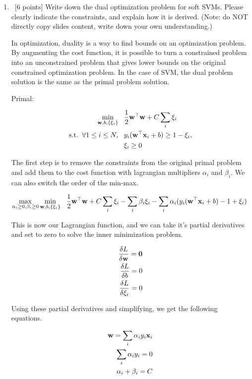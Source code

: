 \documentclass[12pt, fullpage,letterpaper]{article}
\begin{document}
\begin{enumerate}
\begin{enumerate}
	\end{enumerate}
	
	
	\item~[6 points] Write down the dual optimization problem for soft SVMs.  
	Please clearly indicate the constraints, and explain how it is derived. (Note: do NOT directly copy slides content, write down your own understanding.)
	
	In optimization, duality is a way to find bounds on an optimization problem. By augmenting the cost function, it is possible to turn a constrained problem into an unconstrained problem that gives lower bounds on the original constrained optimization problem. In the case of SVM, the dual problem solution is the same as the primal problem solution. 
	
	Primal:
	
		\begin{align}
		\min\limits_{{\bf w}, b, \{\xi_i\}} &\;\;\;\frac{1}{2}{\bf w}^\top{\bf w} + C\sum_i \xi_i \nonumber\\
		\mathrm{s.t.}\;\; \forall 1 \le i \le N,&\;\;\; y_i({\bf w}^\top {\bf x}_i + b) \ge 1 - \xi_i , \nonumber \\
		&\;\;\; \xi_i \ge 0 \nonumber
		\end{align}
	
	The first step is to remove the constraints from the original primal problem and add them to the cost function with lagrangian multipliers $\alpha_i$ and $\beta_i$. We can also switch the order of the min-max.
	
		\begin{align}
		\max\limits_{\alpha_i \ge 0, \beta_i \ge 0} \min\limits_{{\bf w}, b, \{\xi_i\}}  &\;\;\;\frac{1}{2}{\bf w}^\top{\bf w} + C\sum_i \xi_i - \sum_i \beta_i \xi_i - \sum_i \alpha_i  (y_i({\bf w}^\top {\bf x}_i + b) - 1 + \xi_i) \nonumber 
		\end{align}
	
	 This is now our Lagrangian function, and we can take it's partial derivatives and set to zero to solve the inner minimization problem. 
	 
	 
		\begin{align*}
			\frac{\delta L}{\delta {\bf w}} = {\bf 0} \\ 
			\frac{\delta L}{\delta b} = 0 \\ 
			\frac{\delta L}{\delta \xi_i} = 0 
		\end{align*}
		
		Using these partial derivatives and simplifying, we get the following equations.
		
		\begin{align*}
			{\bf w} = \sum_i \alpha_i y_i {\bf x}_i \\
			\sum_i \alpha_i y_i = 0 \\
			\alpha_i + \beta_i = C
		\end{align*}
		

\end{enumerate}
\end{document}
